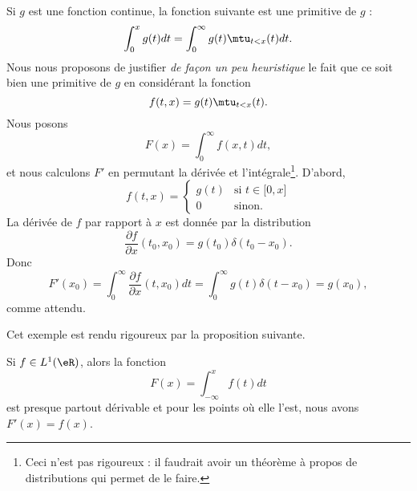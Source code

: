 \begin{example} \label{ExfYXeQg}
	Si \( g\) est une fonction continue, la fonction suivante est une primitive de \( g\) :
	\begin{equation}
		\int_0^xg(t)dt=\int_0^{\infty}g(t)\mtu_{t<x}(t)dt.
	\end{equation}
	Nous nous proposons de justifier \emph{de façon un peu heuristique} le fait que ce soit bien une primitive de \( g\) en considérant la fonction
	\begin{equation}
		f(t,x)=g(t)\mtu_{t<x}(t).
	\end{equation}
	Nous posons
	\begin{equation}
		F(x)=\int_0^{\infty}f(x,t)dt,
	\end{equation}
	et nous calculons \( F'\) en permutant la dérivée et l'intégrale\footnote{Ceci n'est pas rigoureux : il faudrait avoir un théorème à propos de distributions qui permet de le faire.}. D'abord,
	\begin{equation}
		f(t,x)=\begin{cases}
			g(t) & \text{si } t\in \mathopen[ 0 , x \mathclose] \\
			0    & \text{sinon.}
		\end{cases}
	\end{equation}
	La dérivée de \( f\) par rapport à \( x\) est donnée par la distribution
	\begin{equation}
		\frac{ \partial f }{ \partial x }(t_0,x_0)=g(t_0)\delta(t_0-x_0).
	\end{equation}
	Donc
	\begin{equation}
		F'(x_0)=\int_0^{\infty}\frac{ \partial f }{ \partial x }(t,x_0)dt=\int_0^{\infty}g(t)\delta(t-x_0)=g(x_0),
	\end{equation}
	comme attendu.
\end{example}

Cet exemple est rendu rigoureux par la proposition suivante.
\begin{proposition} \label{PropJLnPpaw}
	Si \( f\in L^1(\eR)\), alors la fonction
	\begin{equation}
		F(x)=\int_{-\infty}^xf(t)dt
	\end{equation}
	est presque partout dérivable et pour les points où elle l'est, nous avons \( F'(x)=f(x)\).
\end{proposition}

